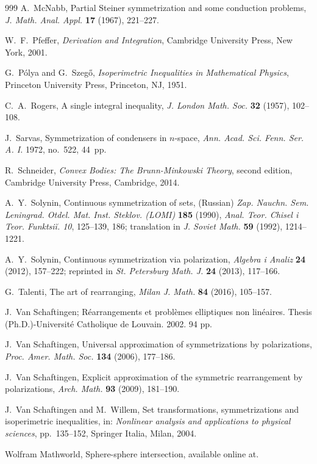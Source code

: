 \documentclass[12pt,reqno]{amsart}
\numberwithin{equation}{section}
\begin{document}
\begin{thebibliography}{999}
A.~McNabb, Partial Steiner symmetrization and some conduction problems, {\em J. Math. Anal. Appl.} {\bf 17} (1967), 221--227.

W.~F.~Pfeffer, {\em Derivation and Integration}, Cambridge University Press, New York, 2001.

G.~P\'{o}lya and G.~Szeg\H{o}, {\em Isoperimetric Inequalities in Mathematical Physics}, Princeton University Press, Princeton, NJ, 1951.

C.~A.~Rogers, A single integral inequality, {\em J. London Math. Soc.} {\bf 32} (1957), 102--108.

J.~Sarvas, Symmetrization of condensers in $n$-space, {\em Ann. Acad. Sci. Fenn. Ser. A. I.} 1972, no.~522, 44~pp.

R.~Schneider, {\em Convex Bodies: The Brunn-Minkowski Theory}, second edition, Cambridge University Press, Cambridge, 2014.

A.~Y.~Solynin, Continuous symmetrization of sets, (Russian) {\em Zap. Nauchn. Sem. Leningrad. Otdel. Mat. Inst. Steklov. (LOMI)} {\bf 185} (1990), {\em Anal. Teor. Chisel i Teor. Funktsiĭ. 10}, 125--139, 186; translation in {\em J. Soviet Math.} {\bf 59} (1992), 1214--1221.

A.~Y.~Solynin, Continuous symmetrization via polarization, {\em Algebra i Analiz} {\bf 24} (2012), 157--222; reprinted in {\em St. Petersburg Math. J.} {\bf 24} (2013), 117--166.

G.~Talenti, The art of rearranging, {\em Milan J. Math.} {\bf 84} (2016), 105--157.

J.~Van Schaftingen; R\'earrangements et probl\`emes elliptiques non lin\'eaires. Thesis (Ph.D.)-Universit\'e Catholique de Louvain. 2002. 94 pp.

J.~Van Schaftingen, Universal approximation of symmetrizations by polarizations, {\em Proc. Amer. Math. Soc.} {\bf 134} (2006), 177--186.

J.~Van Schaftingen, Explicit approximation of the symmetric rearrangement by polarizations, {\em Arch. Math.} {\bf 93} (2009), 181--190.

J.~Van Schaftingen and M.~Willem, Set transformations, symmetrizations and isoperimetric inequalities, in: {\em Nonlinear analysis and applications to physical sciences}, pp.~135--152, Springer Italia, Milan, 2004.

Wolfram Mathworld, Sphere-sphere intersection, available online at.

\end{thebibliography}
\end{document}
